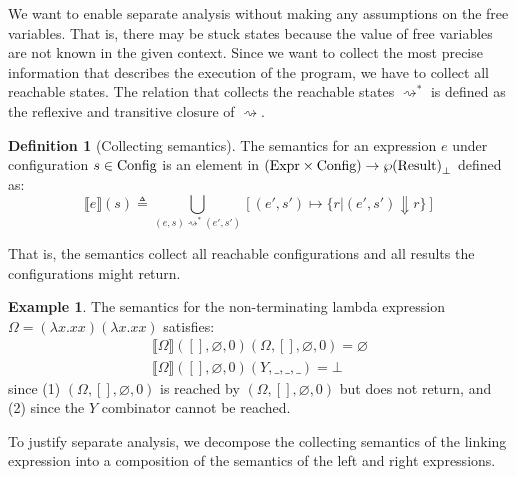 \documentclass{article}
\theoremstyle{definition}
\newtheorem{definition}{Definition}[section]
\newtheorem{example}{Example}[section]
\newcommand*{\Expr}{\text{Expr}}
\newcommand*{\Time}{\mathbb{T}}
\newcommand*{\Config}[1]{\text{Config}\vphantom{#1}}
\newcommand*{\Result}[1]{\text{Result}\vphantom{#1}}
\newcommand*{\sembracket}[1]{\lBrack{#1}\rBrack}
\begin{document}
We want to enable separate analysis without making any assumptions on the free variables.
That is, there may be stuck states because the value of free variables are not known in the given context.
Since we want to collect the most precise information that describes the execution of the program, we have to collect all reachable states.
The relation that collects the reachable states $\rightsquigarrow^{*}$ is defined as the reflexive and transitive closure of $\rightsquigarrow$.

\begin{definition}[Collecting semantics]
  The semantics for an expression $e$ under configuration $s\in\Config{\Time}$ is an element in $(\Expr\times\Config{\Time})\rightarrow{\wp(\Result{\Time})}_{\bot}$ defined as:
  \[
    \sembracket{e}(s)\triangleq\bigcup_{(e,s)\rightsquigarrow^{*}(e',s')}[(e',s')\mapsto\{r|(e',s')\Downarrow r\}]
  \]

  That is, the semantics collect all reachable configurations and all results the configurations might return.
\end{definition}

\begin{example}
  The semantics for the non-terminating lambda expression $\Omega=(\lambda x.xx)(\lambda x.xx)$ satisfies:
  \begin{align*}
    \sembracket{\Omega}([],\varnothing,0)(\Omega,[],\varnothing,0)=\varnothing \\
    \sembracket{\Omega}([],\varnothing,0)(Y,\_,\_,\_)=\bot
  \end{align*}
  since (1) $(\Omega,[],\varnothing,0)$ is reached by $(\Omega,[],\varnothing,0)$ but does not return, and (2) since the $Y$ combinator cannot be reached.
\end{example}

To justify separate analysis, we decompose the collecting semantics of the linking expression into a composition of the semantics of the left and right expressions.
\end{document}
